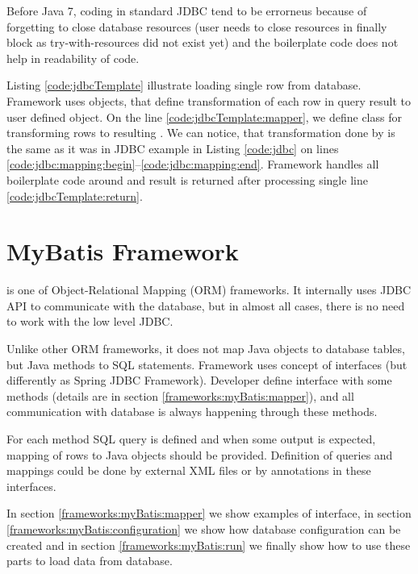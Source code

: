 Before Java 7, coding in standard JDBC tend to be errorneus because of forgetting to close
database resources (user needs to close resources in finally block as try-with-resources did not exist yet)
and the boilerplate code does not help in readability of code.

Listing \ref{code:jdbcTemplate} illustrate loading single row from database.
Framework uses  objects, that define transformation of
each row in query result to user defined object.
On the line \ref{code:jdbcTemplate:mapper}, we define  class
for transforming rows to resulting .
We can notice, that transformation done by  is the same as it was in JDBC example
in Listing \ref{code:jdbc} on lines \ref{code:jdbc:mapping:begin}--\ref{code:jdbc:mapping:end}.
Framework handles all boilerplate code around and result is returned
after processing single line \ref{code:jdbcTemplate:return}.







\section{MyBatis Framework \label{frameworks:myBatis}}

\citet{MyBatis} is one of Object-Relational Mapping (ORM) frameworks.
It internally uses JDBC API to communicate with the database, but in almost all cases,
there is no need to work with the low level JDBC.

Unlike other ORM frameworks, it does not map Java objects to database tables, but Java methods
to SQL statements. Framework uses concept of  interfaces (but differently as Spring JDBC Framework).
Developer define interface with some methods (details are in section \ref{frameworks:myBatis:mapper}),
and all communication with database is always happening through these methods.

For each method SQL query is defined and when some output is expected,
mapping of rows to Java objects should be provided.
Definition of queries and mappings could be done by
external XML files or by annotations in these interfaces.

In section \ref{frameworks:myBatis:mapper} we show examples of  interface,
in section \ref{frameworks:myBatis:configuration} we show how database configuration
can be created and in section \ref{frameworks:myBatis:run} we finally show how to
use these parts to load data from database.




